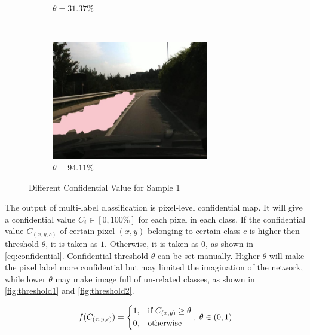 \begin{spacing}{1.5}
\begin{figure}[!ht]
\begin{subfigure}[b]{0.49\textwidth}
        \caption{$\theta = 31.37\%$}
    \end{subfigure}%
    ~
    \begin{subfigure}[b]{0.49\textwidth}
        \centering
        \includegraphics[width=2.7in, fbox]{Chapter5/pic1conf99.png}
        \caption{$\theta = 94.11\%$}
    \end{subfigure}
    \caption{Different Confidential Value for Sample 1}
    \label{fig:threshold1}
\end{figure}


The output of multi-label classification is pixel-level confidential map. It will give a confidential value $C_i \in [0,100\%]$ for each pixel in each class. If the confidential value $C_{(x,y,c)}$ of certain pixel $(x,y)$ belonging to certain class $c$ is higher then threshold $\theta$, it is taken as $1$. Otherwise, it is taken as $0$, as shown in \autoref{eq:confidential}. Confidential threshold $\theta$ can be set manually. Higher $\theta$ will make the pixel label more confidential but may limited the imagination of the network, while lower $\theta$ may make image full of un-related classes, as shown in \autoref{fig:threshold1} and \autoref{fig:threshold2}.

\begin{equation}
\label{eq:confidential}
    f(C_{(x,y,c)})= 
    \begin{dcases}
        1, & \text{if } C_{(x,y)} \geq \theta\\
        0, & \text{otherwise}
    \end{dcases},\; \theta \in (0,1) 
\end{equation}


\end{spacing}
